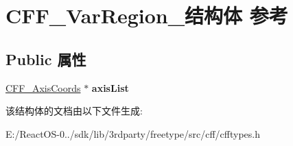 \hypertarget{struct_c_f_f___var_region__}{}\section{C\+F\+F\+\_\+\+Var\+Region\+\_\+结构体 参考}
\label{struct_c_f_f___var_region__}
\subsection*{Public 属性}
\begin{DoxyCompactItemize}
\item 
\mbox{\label{struct_c_f_f___var_region___a82c0440c08ece7af2d3f388bad9d367d}} 
\hyperlink{struct_c_f_f___axis_coords__}{C\+F\+F\+\_\+\+Axis\+Coords} $\ast$ {\bfseries axis\+List}
\end{DoxyCompactItemize}


该结构体的文档由以下文件生成\+:\begin{DoxyCompactItemize}
\item 
E\+:/\+React\+O\+S-\/0../sdk/lib/3rdparty/freetype/src/cff/cfftypes.\+h\end{DoxyCompactItemize}

